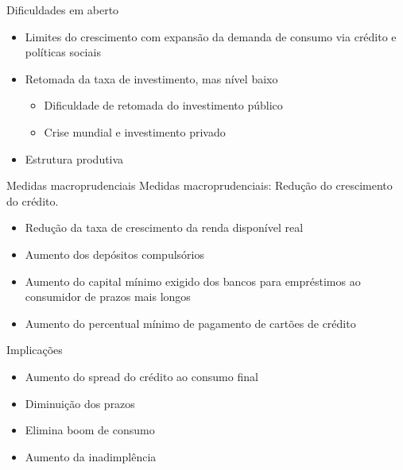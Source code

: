 \documentclass[presentation]{beamer}
\begin{document}
\begin{frame}[label={sec:orgbea04b6}]{Dificuldades em aberto \cite{mello_2017_industrialismo}}
\begin{itemize}
\item Limites do crescimento com expansão da demanda de consumo via crédito e políticas sociais
\item Retomada da taxa de investimento, mas nível baixo
\begin{itemize}
\item Dificuldade de retomada do investimento público
\item Crise mundial e investimento privado
\end{itemize}
\item Estrutura produtiva
\end{itemize}
\end{frame}

\begin{frame}[label={sec:orga2cc513}]{Medidas macroprudenciais}
\alert{Medidas macroprudenciais:} Redução do crescimento do crédito.

\begin{itemize}
\item Redução da taxa de crescimento da renda disponível real
\item Aumento dos depósitos compulsórios
\item Aumento do capital mínimo exigido dos bancos para empréstimos ao consumidor de prazos mais longos
\item Aumento do percentual mínimo de pagamento de cartões de crédito
\end{itemize}

\begin{block}{Implicações}
\begin{itemize}
\item Aumento do spread do crédito ao consumo final
\item Diminuição dos prazos
\item Elimina \alert{boom} de consumo
\item Aumento da inadimplência
\end{itemize}
\end{block}
\end{frame}
\end{document}
